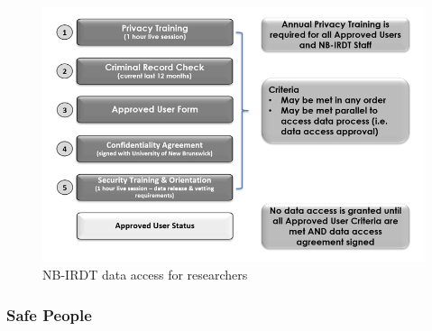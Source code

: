 \documentclass[
]{WileySix}
\begin{document}
\begin{figure}
\includegraphics[width=1\linewidth]{./assets/nbirdt/nbirdtfigure3web} \caption{NB-IRDT data access for researchers}\label{fig:nbirdtfigure3}
\end{figure}

\hypertarget{safe-people-2}{%
\subsubsection{Safe People}\label{safe-people-2}}
\end{document}
